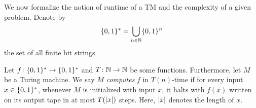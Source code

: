 We now formalize the notion of runtime of a TM and the complexity of a given problem.
Denote by
\[
  \{0, 1\}^* = \bigcup_{n \in \mathbb{N}} \{0, 1\}^n
\]
the set of all finite bit strings.

\begin{definition}{\cite[Def.\ 1.3]{Arora_2009_Computational}}%
  \label{def:complexity.runtime}
  Let $f\colon \{0, 1\}^* \to \{0, 1\}^*$ and $T\colon \mathbb{N} \to \mathbb{N}$ be some functions.
  Furthermore, let $M$ be a Turing machine.
  We say $M$ \emph{computes} $f$ in $T(n)$-time if for every input $x \in \{0, 1\}^*$, whenever $M$ is initialized with input $x$, it halts with $f(x)$ written on its output tape in at most $T({\vert x\vert})$ steps.
  Here, ${\vert x\vert}$ denotes the length of $x$.
\end{definition}

